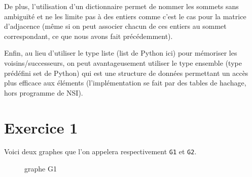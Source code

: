 \documentclass[12pt]{book}
\begin{document}
De plus, l'utilisation d'un dictionnaire permet de nommer les sommets sans ambiguïté et ne les limite pas à des entiers comme c'est le cas pour la matrice d'adjacence (même si on peut associer chacun de ces entiers au sommet correspondant, ce que nous avons fait précédemment).

Enfin, au lieu d'utiliser le type liste (list de Python ici) pour mémoriser les voisins/successeurs, on peut avantageusement utiliser le type ensemble (type prédéfini set de Python) qui est une structure de données permettant un accès plus efficace aux éléments (l'implémentation se fait par des tables de hachage, hors programme de NSI).


%
%
%



\section{Exercice 1}\label{exercice-1}

Voici deux graphes que l'on appelera respectivement \texttt{G1} et
\texttt{G2}.

\begin{SCfigure}
\caption{graphe G1}
\end{SCfigure}
\end{document}
